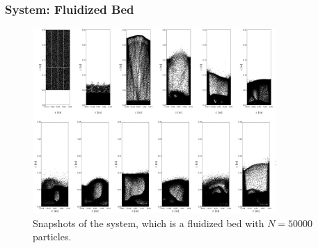 \documentclass[9pt, english]{beamer}
\begin{document}
\begin{frame}[fragile]
\frametitle{System: Fluidized Bed}
\begin{figure}
\centering
\includegraphics[width=0.825\textwidth]{fludidized_bed_evolution_5_2_low.jpg}
\caption{Snapshots of the system, which is a fluidized bed with \(N=50000\) particles.}
\end{figure}
\end{frame}
\end{document}

